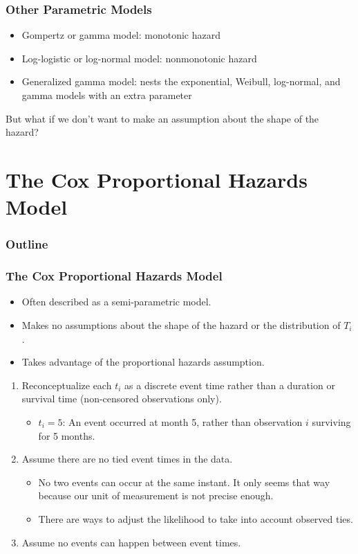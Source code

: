 \documentclass[handout]{beamer}
\begin{document}
\begin{frame}
\normalsize
\frametitle{Other Parametric Models}
\pause
\begin{itemize}
\item Gompertz or gamma model: monotonic hazard
\pause
\item Log-logistic or log-normal model: nonmonotonic hazard
\pause
\item Generalized gamma model: nests the exponential, Weibull,
log-normal, and gamma models with an extra parameter
\end{itemize}
\pause
\bigskip
But what if we don't want to make an assumption about the shape of the
hazard?
\end{frame}

\section{The Cox Proportional Hazards Model}

\begin{frame}
\frametitle{Outline}
\tableofcontents[currentsection]
\end{frame}

\begin{frame}
\frametitle{The Cox Proportional Hazards Model}
\pause
\begin{itemize}
\item Often described as a semi-parametric model.
\pause
\item Makes no assumptions about the shape of the hazard or the
distribution of $T_i$.
\pause
\item Takes advantage of the proportional hazards assumption.
\end{itemize}
\end{frame}

\begin{frame}
\begin{enumerate}
\item Reconceptualize each $t_i$ as a discrete event time rather than
a duration or survival time (non-censored observations only). 
\pause
\begin{itemize}
\item $t_i = 5$: An event occurred at month 5, rather than observation
$i$ surviving for 5 months.
\end{itemize}
\pause
\item Assume there are no tied event times in the data.
\pause
\begin{itemize}
\pause
\item No two events can occur at the same instant.  It only seems that
way because our unit of measurement is not precise enough.
\pause
\item There are ways to adjust the likelihood to take into account
observed ties.
\end{itemize}
\pause
\item Assume no events can happen between event times.
\end{enumerate}
\end{frame}
\end{document}
